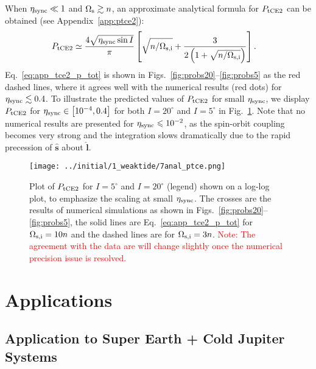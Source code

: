 \documentclass[
        fleqn,
        usenatbib,
    ]{mnras}
\newcommand*{\p}[1]{\left(#1\right)}
\newcommand*{\s}[1]{\left[#1\right]}
\newcommand*{\uv}[1]{\hat{\boldsymbol{\mathbf{#1}}}}
\begin{document}
When $\eta_{\rm sync} \ll 1$ and $\Omega_{\rm s} \gtrsim n$, an approximate
analytical formula for $P_{\rm tCE2}$ can be obtained (see
Appendix~\ref{app:ptce2}):
\begin{align}
    P_{\rm tCE2} &\simeq
            \frac{4\sqrt{\eta _{\rm sync} \sin I}}{\pi}\s{
                \sqrt{n / \Omega_{\rm s, i}}
                + \frac{3}{2\p{1
                + \sqrt{n / \Omega_{\rm s, i}}}}}.\label{eq:app_tce2_p_tot}
\end{align}
Eq.~\eqref{eq:app_tce2_p_tot} is shown in
Figs.~\ref{fig:probs20}--\ref{fig:probs5} as the red dashed lines, where it
agrees well with the numerical results (red dots) for $\eta_{\rm sync} \lesssim
0.4$. To illustrate the predicted values of $P_{\rm tCE2}$ for small $\eta_{\rm
sync}$, we display $P_{\rm tCE2}$ for $\eta_{\rm sync} \in \s{10^{-4}, 0.4}$ for
both $I = 20^\circ$ and $I = 5^\circ$ in Fig.~\ref{fig:anal_ptce}. Note that no
numerical results are presented for $\eta_{\rm sync} \leq 10^{-2}$, as the
spin-orbit coupling becomes very strong and the integration slows dramatically
due to the rapid precession of $\uv{s}$ about $\uv{l}$.
\begin{figure}
    \centering
    \texttt{[image: ../initial/1\_weaktide/7anal\_ptce.png]}
    \caption{Plot of $P_{\rm tCE2}$ for $I = 5^\circ$ and $I = 20^\circ$
    (legend) shown on a log-log plot, to emphasize the scaling at small
    $\eta_{\rm sync}$. The crosses are the results of numerical simulations as
    shown in Figs.~\ref{fig:probs20}--\ref{fig:probs5}, the solid lines are
    Eq.~\eqref{eq:app_tce2_p_tot} for $\Omega_{\rm s, i} = 10n$ and the dashed
    lines are for $\Omega_{\rm s, i} = 3n$. \textcolor{red}{Note: The agreement
    with the data are will change slightly once the numerical
    precision issue is resolved.}}\label{fig:anal_ptce}
\end{figure}

\section{Applications}\label{s:applications}

\subsection{Application to Super Earth + Cold Jupiter Systems
}\label{ss:disc_sehj}
\end{document}
